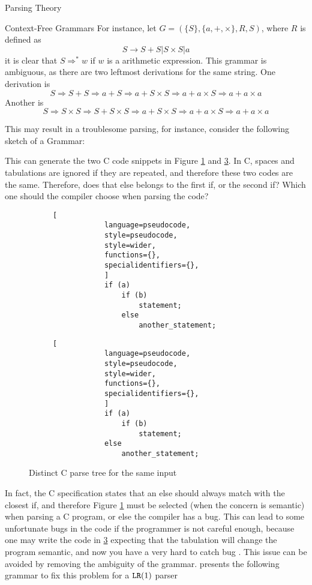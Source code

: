 \begin{section}{Parsing Theory}
\begin{subsection}{Context-Free Grammars}
For instance, let $G = (\{S\}, \{a, +, \times\}, R, S)$, where $R$ is defined
as
$$S \rightarrow S+S | S \times S | a $$
it is clear that $S \Rightarrow^* w$ if $w$ is a arithmetic expression. This
grammar is ambiguous, as there are two leftmost derivations for the same string.
One derivation is
$$ S \Rightarrow S + S \Rightarrow a + S \Rightarrow a + S \times S \Rightarrow a + a \times S \Rightarrow a + a \times a$$
Another is
$$ S \Rightarrow S \times S \Rightarrow S + S \times S \Rightarrow a + S \times S \Rightarrow a + a \times S \Rightarrow a + a \times a$$

This may result in a troublesome parsing, for instance, consider the
following sketch of a Grammar:



This can generate the two C code snippets in Figure \ref{fig:left_if} and
\ref{fig:right_if}. In C, spaces and tabulations are ignored if they are
repeated, and therefore these two codes are the same. Therefore, does that else
belongs to the first if, or the second if? Which one should the compiler choose
when parsing the code?

\begin{figure}[ht]
    \centering
    \begin{subfigure}[b]{0.40\textwidth}

		\begin{lstlisting}[
			language=pseudocode,
			style=pseudocode,
			style=wider,
			functions={},
			specialidentifiers={},
			]
			if (a)
				if (b)
					statement;
				else
					another_statement;
		\end{lstlisting}
        \caption{\label{fig:left_if}}

    \end{subfigure}
    \begin{subfigure}[b]{0.40\textwidth}
		\begin{lstlisting}[
			language=pseudocode,
			style=pseudocode,
			style=wider,
			functions={},
			specialidentifiers={},
			]
			if (a)
				if (b)
					statement;
			else
				another_statement;
		\end{lstlisting}
        \caption{\label{fig:right_if}}
\end{subfigure}
\caption{Distinct C parse tree for the same input}
\end{figure}

In fact, the C specification states that an else should always match with the closest
if, and therefore Figure \ref{fig:left_if} must be selected (when the concern is
semantic) when parsing a C program, or else the compiler has a bug. This can lead
to some unfortunate bugs in the code if the programmer is not careful enough,
because one may write the code in \ref{fig:right_if} expecting that the
tabulation will change the program semantic, and now you have a very hard to
catch bug \citep{ritchie1988c}. This issue can be avoided by removing the
ambiguity of the grammar. \cite{dragonbook} presents the following grammar
to fix this problem for a $\texttt{LR}(1)$ parser


\end{subsection}
\end{section}
